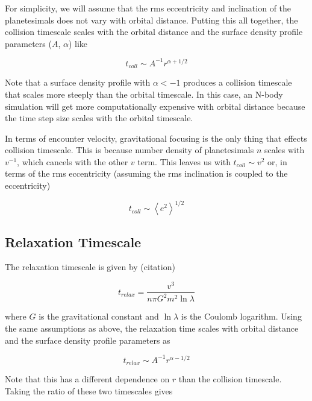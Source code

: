 \documentclass[onecolumn]{aastex63}
\begin{document}
\noindent For simplicity, we will assume that the rms eccentricity and inclination of the planetesimals does not vary with orbital distance. Putting this all together, the collision timescale scales with the orbital distance and the surface density profile parameters ($A$, $\alpha$) like

\begin{equation}
	t_{coll} \sim A^{-1} r^{\alpha + 1/2}
\end{equation}

Note that a surface density profile with $\alpha < -1$ produces a collision timescale that scales more steeply than the orbital timescale. In this case, an N-body simulation will get more computationally expensive with orbital distance because the time step size scales with the orbital timescale.

In terms of encounter velocity, gravitational focusing is the only thing that effects collision timescale. This is because number density of planetesimals $n$ scales with $v^{-1}$, which cancels with the other $v$ term. This leaves us with $t_{coll} \sim v^{2}$ or, in terms of the rms eccentricity (assuming the rms inclination is coupled to the eccentricity)

\begin{equation}
    t_{coll} \sim \left< e^{2} \right>^{1/2}
\end{equation}

\subsection{Relaxation Timescale}

The relaxation timescale is given by (citation)

\begin{equation}
    t_{relax} = \frac{v^3}{n \pi G^{2} m^{2} \ln \lambda}
\end{equation}

\noindent where $G$ is the gravitational constant and $\ln \lambda$ is the Coulomb logarithm. Using the same assumptions as above, the relaxation time scales with orbital distance and the surface density profile parameters as

\begin{equation}
    t_{relax} \sim A^{-1} r^{\alpha - 1/2}
\end{equation}

Note that this has a different dependence on $r$ than the collision timescale. Taking the ratio of these two timescales gives
\end{document}

